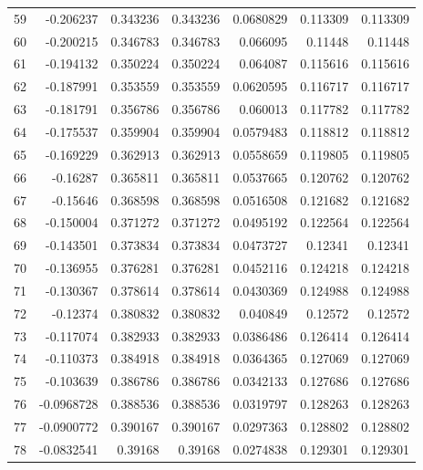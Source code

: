 \begin{tabular}{rrrrrrr}
  59 & -0.206237    & 0.343236    & 0.343236    &  0.0680829   & 0.113309    & 0.113309    \\
  60 & -0.200215    & 0.346783    & 0.346783    &  0.066095    & 0.11448     & 0.11448     \\
  61 & -0.194132    & 0.350224    & 0.350224    &  0.064087    & 0.115616    & 0.115616    \\
  62 & -0.187991    & 0.353559    & 0.353559    &  0.0620595   & 0.116717    & 0.116717    \\
  63 & -0.181791    & 0.356786    & 0.356786    &  0.060013    & 0.117782    & 0.117782    \\
  64 & -0.175537    & 0.359904    & 0.359904    &  0.0579483   & 0.118812    & 0.118812    \\
  65 & -0.169229    & 0.362913    & 0.362913    &  0.0558659   & 0.119805    & 0.119805    \\
  66 & -0.16287     & 0.365811    & 0.365811    &  0.0537665   & 0.120762    & 0.120762    \\
  67 & -0.15646     & 0.368598    & 0.368598    &  0.0516508   & 0.121682    & 0.121682    \\
  68 & -0.150004    & 0.371272    & 0.371272    &  0.0495192   & 0.122564    & 0.122564    \\
  69 & -0.143501    & 0.373834    & 0.373834    &  0.0473727   & 0.12341     & 0.12341     \\
  70 & -0.136955    & 0.376281    & 0.376281    &  0.0452116   & 0.124218    & 0.124218    \\
  71 & -0.130367    & 0.378614    & 0.378614    &  0.0430369   & 0.124988    & 0.124988    \\
  72 & -0.12374     & 0.380832    & 0.380832    &  0.040849    & 0.12572     & 0.12572     \\
  73 & -0.117074    & 0.382933    & 0.382933    &  0.0386486   & 0.126414    & 0.126414    \\
  74 & -0.110373    & 0.384918    & 0.384918    &  0.0364365   & 0.127069    & 0.127069    \\
  75 & -0.103639    & 0.386786    & 0.386786    &  0.0342133   & 0.127686    & 0.127686    \\
  76 & -0.0968728   & 0.388536    & 0.388536    &  0.0319797   & 0.128263    & 0.128263    \\
  77 & -0.0900772   & 0.390167    & 0.390167    &  0.0297363   & 0.128802    & 0.128802    \\
  78 & -0.0832541   & 0.39168     & 0.39168     &  0.0274838   & 0.129301    & 0.129301    \\

\end{tabular}

